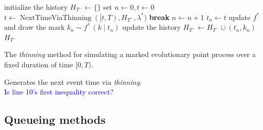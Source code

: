 \documentclass{juliacon}
\newcommand\ubar[1]{\stackunder[1.2pt]{\(#1\)}{\rule{.8ex}{.075ex}}}
\newcommand{\comment}[1]{\textcolor{blue}{#1}}
\begin{document}
\begin{algorithm}[h]
\begin{algorithmic}[1]
  \Procedure{ThinningMethod}{\( [0, T) \), \( \lambda^\ast \), \( f^\ast \),}
    \State initialize the history \( H_{T^-} \leftarrow \{ \} \)
    \State set \( n \leftarrow 0, t \leftarrow 0 \)
      \State \( t \leftarrow \operatorname{NextTimeViaThinning}([t, T), H_{T^-}, \lambda^\ast) \)
        \State \textbf{break}
      \EndIf
      \State \( n \leftarrow n + 1 \)
      \State \( t_n \leftarrow t \)
      \State update  \( f^\ast \) and draw the mark \( k_n \sim f^\ast \, (k \mid t_n) \)
      \State update the history \( H_{T^-} \leftarrow H_{T^-} \cup (t_n, k_n) \)
    \EndWhile
    \State \Return \( H_{T^-} \)
  \EndProcedure
\end{algorithmic}
\caption{The \textit{thinning} method for simulating a marked evolutionary point process over a fixed duration of time \( [0, T) \).}
\label{algo:sim-thinning}
\end{algorithm}

\begin{algorithm}[h]
\begin{algorithmic}[1]
  \Procedure{NextTimeViaThinning}{\([t, T) \), \( \lambda^\ast \), \( H_{t} \),}
        \State update \( \lambda^\ast \)
        \State find \( \bar{M}^\ast (t) \), \( \ubar{M}^\ast (t) \) and \( L^\ast(t) \) which satisfy Eq.~\ref{eq:thinning-condition}
        \State draw \( u \sim \exp(1 \; / \; \bar{M}^\ast(t)) \) and \( v \sim U[0, 1] \)
        \If{\( u > L^\ast(t) \)}
          \State \( t \leftarrow t + L^\ast(t) \)
          \State \textbf{next}
        \EndIf
        \If{\( ( v > \ubar{M}^\ast(t) ) \) and \( ( v > \lambda^\ast \, (t + u) \; / \; \bar{M}^\ast(t) ) \)}
          \State \( t \leftarrow t + u \)
          \State \textbf{next}
        \EndIf
        \State \( t \leftarrow t + u \)
        \State \textbf{break}
      \EndWhile
      \State \Return \( t \)
  \EndProcedure
\end{algorithmic}
\caption{Generates the next event time via \textit{thinning}. \\ \comment{Is line 10's first inequality correct?}}
\label{algo:next-time-thinning}
\end{algorithm}

\subsection{Queueing methods} \label{subsec:sim-first}
\end{document}
